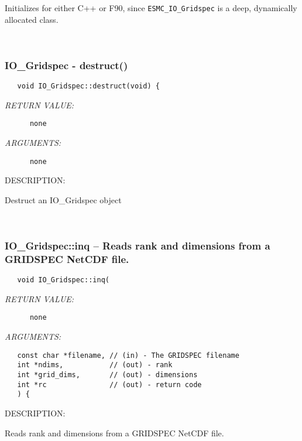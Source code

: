         Initializes for either C++ or F90, since {\tt ESMC\_IO\_Gridspec} is a deep,
        dynamically allocated class.
   
 
\mbox{}\hrulefill\ 
 
\subsubsection [IO\_Gridspec] {IO\_Gridspec - destruct()}


  
\begin{verbatim}   void IO_Gridspec::destruct(void) {\end{verbatim}{\em RETURN VALUE:}
\begin{verbatim}      none\end{verbatim}{\em ARGUMENTS:}
\begin{verbatim}      none\end{verbatim}
{\sf DESCRIPTION:\\ }


        Destruct an IO_Gridspec object
   
 
\mbox{}\hrulefill\ 
 
\subsubsection [IO\_Gridspec::inq] {IO\_Gridspec::inq -- Reads rank and dimensions from a GRIDSPEC NetCDF file.}


  
\begin{verbatim}   void IO_Gridspec::inq(\end{verbatim}{\em RETURN VALUE:}
\begin{verbatim}      none\end{verbatim}{\em ARGUMENTS:}
\begin{verbatim}   const char *filename, // (in) - The GRIDSPEC filename
   int *ndims,           // (out) - rank
   int *grid_dims,       // (out) - dimensions
   int *rc               // (out) - return code
   ) {\end{verbatim}
{\sf DESCRIPTION:\\ }


        Reads rank and dimensions from a GRIDSPEC NetCDF file.
  
\setlength{\parskip}{\oldparskip}
\setlength{\parindent}{\oldparindent}
\setlength{\baselineskip}{\oldbaselineskip}

